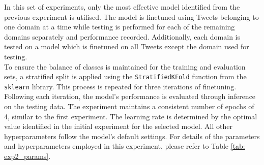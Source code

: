 In this set of experiments, only the most effective model identified from the previous experiment is utilised. The model is finetuned using Tweets belonging to one domain at a time while testing is performed for each of the remaining domains separately and performance recorded. Additionally, each domain is tested on a  model which is finetuned on all Tweets except the domain used for testing.\\

To ensure the balance of classes is maintained for the training and evaluation sets, a stratified split is applied using the \texttt{StratifiedKFold} function from the \texttt{sklearn} library. This process is repeated for three iterations of finetuning. Following each iteration, the model's performance is evaluated through inference on the testing data. The experiment maintains a consistent number of epochs of 4, similar to the first experiment. The learning rate is determined by the optimal value identified in the initial experiment for the selected model. All other hyperparameters follow the model's default settings. For details of the parameters and hyperparameters employed in this experiment, please refer to Table \ref{tab: exp2_params}.

